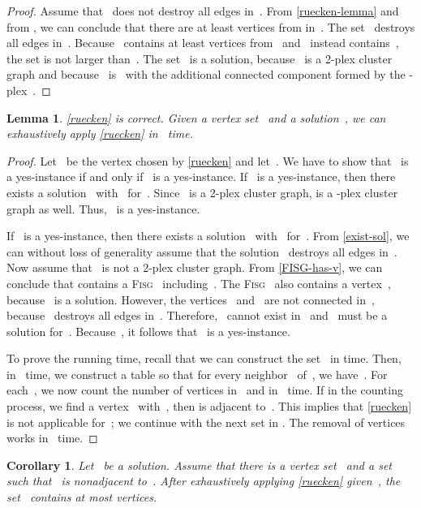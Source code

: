 \documentclass[12pt, a4paper, abstracton]{scrreprt}
\newcommand{\pl}[1]{\mbox{-plex}}
\newcommand{\pcg}[1]{\pl #1 cluster graph}
\newcommand{\FISG}{\textsc{Fisg}}
\newcounter{theorem}
\newtheorem{korollar}{Corollary}[chapter]
\newtheorem{lemma}{Lemma}[chapter]
\theoremstyle{definition}
\theoremstyle{remark}
\begin{document}
\begin{proof}
  Assume that~ does not destroy all edges in~. From
  \autoref{ruecken-lemma} and from , we can conclude that there are at least 
  vertices from  in~. The set~ destroys all edges in~. Because~
  contains at least  vertices from~
  and~ instead contains~, the set  is not larger
  than~. The set ~is a solution,
  because~ is a 2-plex cluster graph and because
  ~is ~with the additional connected component formed
  by the \pl2~.
\end{proof}

\begin{lemma}\label{ruecken-time}
  \autoref{ruecken} is correct. Given a vertex set~ and a solution~, we can exhaustively apply \autoref{ruecken} in ~time.
\end{lemma}

\begin{proof}
  Let~ be the vertex chosen by \autoref{ruecken} and let~.
  We have to show that~ is a yes-instance if and only
  if~ is a yes-instance. If~ is a yes-instance, then there
  exists a solution~ with~ for~. Since~ is
  a 2-plex cluster graph,  is a \pcg2 as well. Thus, ~is a
  yes-instance.

  If ~is a yes-instance, then there exists a solution~
  with~ for~. From \autoref{exist-sol}, we can without
  loss of generality assume that the solution~ destroys all edges
  in~.  Now assume that~ is not a 2-plex cluster
  graph. From \autoref{FISG-has-v}, we can conclude that  contains
  a \FISG{}~ including~. The \FISG{}~ also contains a vertex~, because~ is a solution. However, the vertices~
  and~ are not connected in~, because ~destroys all edges
  in~. Therefore, ~cannot exist in~ and ~must be
  a solution for~. Because~, it follows that ~is
  a yes-instance.

  To prove the running time, recall that we can construct the set~ in  time. Then, in~ time, we construct a table  so that for every neighbor~ of~, we have~.  For each~, we now count the number of vertices in~ and  in ~time. If in the counting process, we find a vertex~ with~, then  is adjacent to~. This implies that \autoref{ruecken} is not applicable for~; we continue with the next set in . The removal of vertices works in ~time.
\end{proof}

\begin{korollar}\label{h0-vertices}
  Let~ be a solution. Assume that there is a vertex set~ and a
  set~ such that~ is nonadjacent to~.
  After exhaustively applying \autoref{ruecken} given~, the set~ contains at most  vertices.
\end{korollar}
\end{document}
